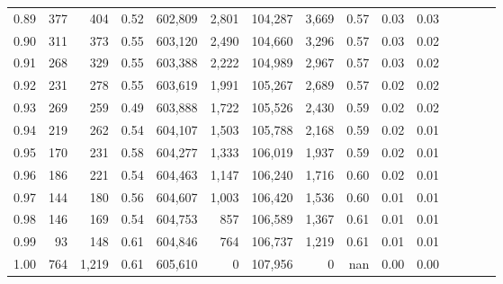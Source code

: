 \begin{tabular}{rrrcrrrrrrrrrrr}
0.89 &     377 &    404 &                                       0.52 &  602,809 &    2,801 &  104,287 &    3,669 &  0.57 &  0.03 &                         0.03 \\
0.90 &     311 &    373 &                                       0.55 &  603,120 &    2,490 &  104,660 &    3,296 &  0.57 &  0.03 &                         0.02 \\
0.91 &     268 &    329 &                                       0.55 &  603,388 &    2,222 &  104,989 &    2,967 &  0.57 &  0.03 &                         0.02 \\
0.92 &     231 &    278 &                                       0.55 &  603,619 &    1,991 &  105,267 &    2,689 &  0.57 &  0.02 &                         0.02 \\
0.93 &     269 &    259 &                                       0.49 &  603,888 &    1,722 &  105,526 &    2,430 &  0.59 &  0.02 &                         0.02 \\
0.94 &     219 &    262 &                                       0.54 &  604,107 &    1,503 &  105,788 &    2,168 &  0.59 &  0.02 &                         0.01 \\
0.95 &     170 &    231 &                                       0.58 &  604,277 &    1,333 &  106,019 &    1,937 &  0.59 &  0.02 &                         0.01 \\
0.96 &     186 &    221 &                                       0.54 &  604,463 &    1,147 &  106,240 &    1,716 &  0.60 &  0.02 &                         0.01 \\
0.97 &     144 &    180 &                                       0.56 &  604,607 &    1,003 &  106,420 &    1,536 &  0.60 &  0.01 &                         0.01 \\
0.98 &     146 &    169 &                                       0.54 &  604,753 &      857 &  106,589 &    1,367 &  0.61 &  0.01 &                         0.01 \\
0.99 &      93 &    148 &                                       0.61 &  604,846 &      764 &  106,737 &    1,219 &  0.61 &  0.01 &                         0.01 \\
1.00 &     764 &  1,219 &                                       0.61 &  605,610 &        0 &  107,956 &        0 &   nan &  0.00 &                         0.00 \\
\bottomrule
\end{tabular}
